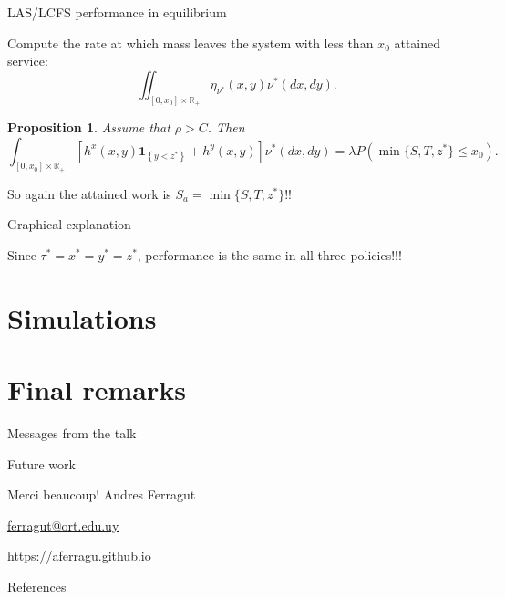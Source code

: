 \documentclass[aspectratio=169]{beamer}
\newcommand{\R}{\mathbb{R}}
\newcommand{\ind}[1]{\mathbf{1}_{\left\{#1\right\}}}
\newtheorem{proposition}{Proposition}
\begin{document}
\begin{frame}{LAS/LCFS performance in equilibrium}

	Compute the rate at which mass leaves the system with less than $x_0$ attained service:
	\begin{equation*}
		\iint_{[0,x_0]\times \R_+} \eta_{\nu^*} (x,y) \nu^*(dx,dy).
	\end{equation*}

	\pause

	\begin{proposition}
		Assume that $\rho > C$. Then
		\begin{equation*}
			\int_{[0,x_0]\times \R_+} \left[h^x(x, y) \ind{y < z^*} + h^y(x, y)\right]\nu^*(dx, dy) = \lambda P\left(\min\{S, T, z^*\} \leqslant x_0\right).
		\end{equation*}
	\end{proposition}
	
	So again the attained work is $S_a = \min\{S,T,z^*\}$!!

\end{frame}


\begin{frame}{Graphical explanation}

	\begin{center}
		 
	\end{center}

	\bigskip

	Since $\tau^* = x^* = y^* = z^*$, performance is the same in all three policies!!!
\end{frame}

\section{Simulations}



\section{Final remarks}

\begin{frame}{Messages from the talk}
	
\end{frame}

\begin{frame}{Future work}
	
\end{frame}


\begin{frame}[plain]
	\vfill
	{\Huge \alert{Merci beaucoup!}}
	\vfill
	Andres Ferragut

	\smallskip

	\href{mailto://ferragut@ort.edu.uy}{\alert{ferragut@ort.edu.uy}}
	
	\smallskip

	\href{http://aferragu.github.io}{\alert{https://aferragu.github.io}}
\end{frame}

\begin{frame}[allowframebreaks]{References}
	
\end{frame}
\end{document}
